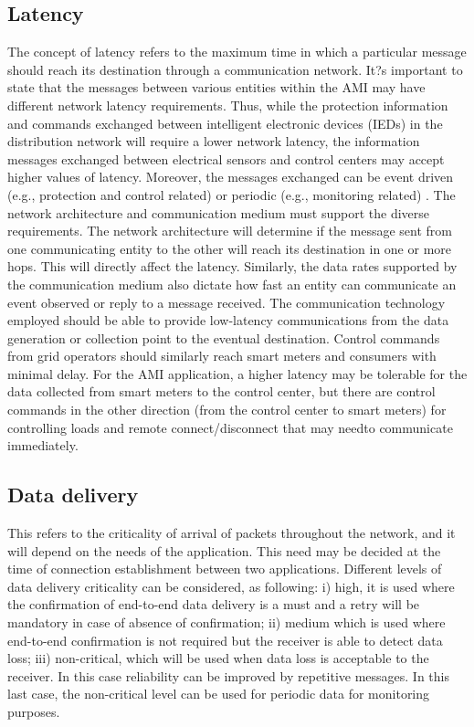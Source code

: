 \documentclass[11pt,draftclsnofoot,onecolumn]{IEEEtran}
\begin{document}
\subsection{Latency}
The concept of latency refers to the maximum time in which a particular message should reach its destination through a communication network. It?s important to state that the messages between various entities within the AMI may have different network latency requirements. Thus, while the protection information and commands exchanged between intelligent electronic devices (IEDs) in the distribution network will require a lower network latency, the information messages exchanged between electrical sensors and control centers may accept higher values of latency.  Moreover, the messages exchanged can be event driven (e.g., protection and control related) or periodic (e.g., monitoring related) \cite{Winter2012}. The network architecture and communication medium must support the diverse requirements. The network architecture will determine if the message sent from one communicating entity to the other will reach its destination in one or more hops. This will directly affect the latency. Similarly, the data rates supported by the communication medium also dictate how fast an entity can communicate an event observed or reply to a message received.  The communication technology employed should be able to provide low-latency communications from the data generation or collection point to the eventual destination. Control commands from grid operators should similarly reach smart meters and consumers with minimal delay. For the AMI application, a higher latency may be tolerable for the data collected from smart meters to the control center, but there are control commands in the other direction (from the control center to smart meters) for controlling loads and remote connect/disconnect that may needto communicate immediately.

\subsection{Data delivery}
This refers to the criticality of arrival of packets throughout the network, and it will depend on the needs of the application. This need may be decided at the time of connection establishment between two applications. Different levels of data delivery criticality can be considered, as following: i) high, it is used where the confirmation of end-to-end data delivery is a must and a retry will be mandatory in case of absence of confirmation; ii) medium which is used where end-to-end confirmation is not required but the receiver is able to detect data loss; iii) non-critical, which will be used when data loss is acceptable to the receiver. In this case reliability can be improved by repetitive messages. In this last case, the non-critical level can be used for periodic data for monitoring purposes. 
\end{document}
